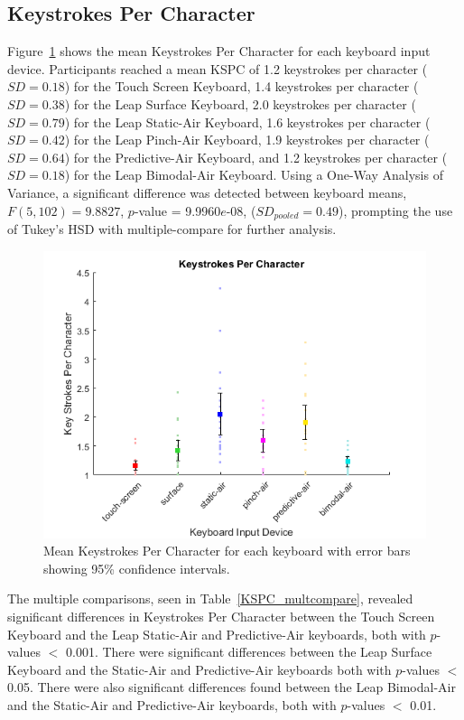 \subsection{Keystrokes Per Character}
Figure~\ref{fig_KSPC_mean} shows the mean Keystrokes Per Character for each keyboard input device. Participants reached a mean KSPC of 1.2 keystrokes per character ($SD = 0.18$) for the Touch Screen Keyboard, 1.4 keystrokes per character  ($SD = 0.38$) for the Leap Surface Keyboard, 2.0 keystrokes per character ($SD = 0.79$) for the Leap Static-Air Keyboard, 1.6 keystrokes per character ($SD = 0.42$) for the Leap Pinch-Air Keyboard, 1.9 keystrokes per character ($SD = 0.64$) for the Predictive-Air Keyboard, and 1.2 keystrokes per character ($SD = 0.18$) for the Leap Bimodal-Air Keyboard. Using a One-Way Analysis of Variance, a significant difference was detected between keyboard means, $F(5, 102) = 9.8827$, $p$-value = 9.9960$e$-08, ($SD_{pooled} = 0.49$), prompting the use of Tukey's HSD with multiple-compare for further analysis.

\begin{figure}[h]
	\centering
	\includegraphics{fig_KSPC_mean}
	\caption[Mean Keystrokes Per Character]{Mean Keystrokes Per Character for each keyboard with error bars showing 95\% confidence intervals.}
	\label{fig_KSPC_mean}
\end{figure}

The multiple comparisons, seen in Table~\ref{KSPC_multcompare}, revealed significant differences in Keystrokes Per Character between the Touch Screen Keyboard and the Leap Static-Air and Predictive-Air keyboards, both with $p$-values $<$ 0.001. There were significant differences between the Leap Surface Keyboard and the Static-Air and Predictive-Air keyboards both with $p$-values $<$ 0.05. There were also significant differences found between the Leap Bimodal-Air and the Static-Air and Predictive-Air keyboards, both with $p$-values $<$ 0.01.

